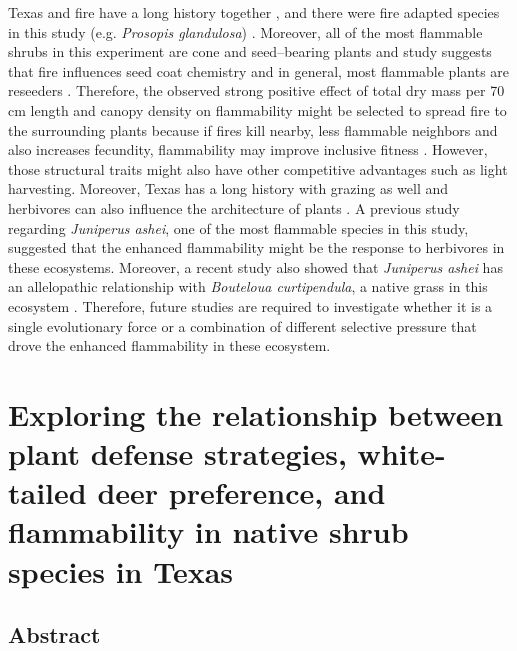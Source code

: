\documentclass{ttuthes2007}
\begin{document}
Texas and fire have a long history together \citep{moir1982firehistory, stambaugh2011firehistory,stambaugh2014historicalfirehistory,smeins2005historyoffire1}, and there were fire adapted species in this study (e.g. \emph{Prosopis glandulosa}) \citep{wright1976effect}. %
Moreover, all of the most flammable shrubs in this experiment are cone and seed--bearing plants %
and study suggests that fire influences seed coat chemistry \citep{mcinnes2022doesseedcoatchemistry} and in general, most flammable plants are reseeders \citep{midgley2011pushingreseeders}. Therefore,  the observed strong positive effect of total dry mass per 70\,cm length and canopy density on flammability might be selected to spread fire to the surrounding plants because if fires kill nearby, less flammable neighbors and also increases fecundity, flammability may improve inclusive fitness \citep{bond1995kill}. However, those structural traits might also have other competitive advantages such as light harvesting. Moreover, Texas has a long history with grazing as well and herbivores can also influence the architecture of plants \citep{danell1994browseeffects}. A previous study regarding \emph{Juniperus ashei}, one of the most flammable species in this study, suggested that the enhanced flammability might be the response to herbivores \citep{owens1998seasonal} in these ecosystems. Moreover, a recent study also showed that \emph{Juniperus ashei} has an allelopathic relationship with \emph{Bouteloua curtipendula}, a native grass in this ecosystem \citep{young2009assessmentallelopathy}. Therefore, future studies are required to investigate whether it is a single evolutionary force or a combination of different selective pressure that drove the enhanced flammability in these ecosystem.

\chapter{Exploring the relationship between plant defense strategies, white-tailed deer preference, and flammability in native shrub species in Texas} 

\section{Abstract}
\end{document}
